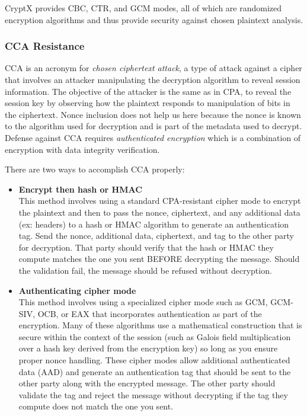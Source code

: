 \documentclass[titlepage]{report}
\begin{document}
	CryptX provides CBC, CTR, and GCM modes, all of which are randomized encryption algorithms and thus provide security against chosen plaintext analysis.
	\subsubsection{CCA Resistance}
	CCA is an acronym for \textit{chosen ciphertext attack}, a type of attack against a cipher that involves an attacker manipulating the decryption algorithm to reveal session information. The objective of the attacker is the same as in CPA, to reveal the session key by observing how the plaintext responds to manipulation of bits in the ciphertext. Nonce inclusion does not help us here because the nonce is known to the algorithm used for decryption and is part of the metadata used to decrypt. Defense against CCA requires \textit{authenticated encryption} which is a combination of encryption with data integrity verification.
	
	There are two ways to accomplish CCA properly:
	\begin{itemize}
		\item\textbf{Encrypt then hash or HMAC}\\This method involves using a standard CPA-resistant cipher mode to encrypt the plaintext and then to pass the nonce, ciphertext, and any additional data (ex: headers) to a hash or HMAC algorithm to generate an authentication tag. Send the nonce, additional data, ciphertext, and tag to the other party for decryption. That party should verify that the hash or HMAC they compute matches the one you sent BEFORE decrypting the message. Should the validation fail, the message should be refused without decryption.
		\item\textbf{Authenticating cipher mode}\\This method involves using a specialized cipher mode such as GCM, GCM-SIV, OCB, or EAX that incorporates authentication as part of the encryption. Many of these algorithms use a mathematical construction that is secure within the context of the session (such as Galois field multiplication over a hash key derived from the encryption key) so long as you ensure proper nonce handling. These cipher modes allow additional authenticated data (AAD) and generate an authentication tag that should be sent to the other party along with the encrypted message. The other party should validate the tag and reject the message without decrypting if the tag they compute does not match the one you sent.
	\end{itemize}
	
\end{document}
